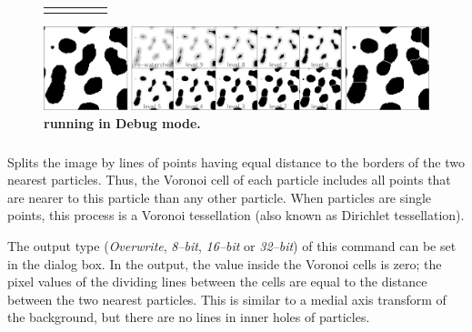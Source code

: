 \begin{figure}
\noindent \setlength{\tabcolsep}{0pt}%
\begin{tabular}{>{\centering}m{}>{\centering}m{}||>{\centering}m{}||>{\centering}m{}>{\centering}m{}}
\noindent \centering{}{\scriptsize Original} & \multicolumn{3}{>{\centering}p{0.555\columnwidth}}{\noindent \centering{}{\scriptsize Segmentation Movie }} & \noindent \centering{}{\scriptsize \nameref{sub:Watershed} result}\tabularnewline
\end{tabular}

\noindent \includegraphics[width=1\columnwidth]{images/WatershedMontage}\caption{\textsf{\protect{}}\textbf{
running in Debug mode.}}
\end{figure}



\subsubsection{\protect{}\label{sub:Voronoi}}

Splits the image
by lines of points having equal distance to the borders of the two
nearest particles. Thus, the Voronoi cell of each
particle includes all points that are nearer to this particle than
any other particle. When particles are single points, this process
is a Voronoi tessellation (also known as Dirichlet
tessellation).

The output type (\emph{Overwrite}, \emph{8--bit}, \emph{16--bit} or
\emph{32--bit}) of this command can be set in the 
dialog box. In the output, the value inside the Voronoi cells is zero;
the pixel values of the dividing lines between the cells are equal
to the distance between the two nearest particles. This is similar
to a medial axis transform of the background, but there are no lines
in inner holes of particles. 


